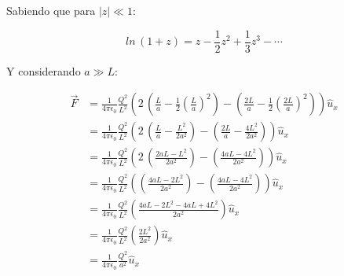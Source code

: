 \documentclass[letter,11pt]{article}
\begin{document}
Sabiendo que para $|z|\ll 1$:

\begin{equation*}
    ln\,(1+z) = z-\frac{1}{2}z^2+\frac{1}{3}z^3-\cdots
\end{equation*}
\vspace{0.20cm}

Y considerando $a \gg L$:

\begin{equation*}
\begin{split}
    \vec{F} &= \frac{1}{4\pi\epsilon_0}\frac{Q^2}{L^2}
               \left(2\,\left(\frac{L}{a}-\frac{1}{2}
               \left(\frac{L}{a}\right)^2\right)-
               \left(\frac{2L}{a}-\frac{1}{2}\left(\frac{2L}{a}\right)^2
               \right)\right)\hat{u}_x\\
            &= \frac{1}{4\pi\epsilon_0}\frac{Q^2}{L^2}
               \left(2\,\left(\frac{L}{a}-\frac{L^2}{2a^2}\right)-
               \left(\frac{2L}{a}-\frac{4L^2}{2a^2}\right)\right)\hat{u}_x\\
            &= \frac{1}{4\pi\epsilon_0}\frac{Q^2}{L^2}
               \left(2\,\left(\frac{2aL-L^2}{2a^2}\right)-
               \left(\frac{4aL-4L^2}{2a^2}\right)\right)\hat{u}_x\\
            &= \frac{1}{4\pi\epsilon_0}\frac{Q^2}{L^2}
               \left(\left(\frac{4aL-2L^2}{2a^2}\right)-
               \left(\frac{4aL-4L^2}{2a^2}\right)\right)\hat{u}_x\\
            &= \frac{1}{4\pi\epsilon_0}\frac{Q^2}{L^2}
               \left(\frac{4aL-2L^2-4aL+4L^2}{2a^2}\right)\hat{u}_x\\
            &= \frac{1}{4\pi\epsilon_0}\frac{Q^2}{L^2}
               \left(\frac{2L^2}{2a^2}\right)\hat{u}_x\\
            &= \frac{1}{4\pi\epsilon_0}\frac{Q^2}{a^2}\hat{u}_x
\end{split}
\end{equation*}
\vspace{0.20cm}
\end{document}
